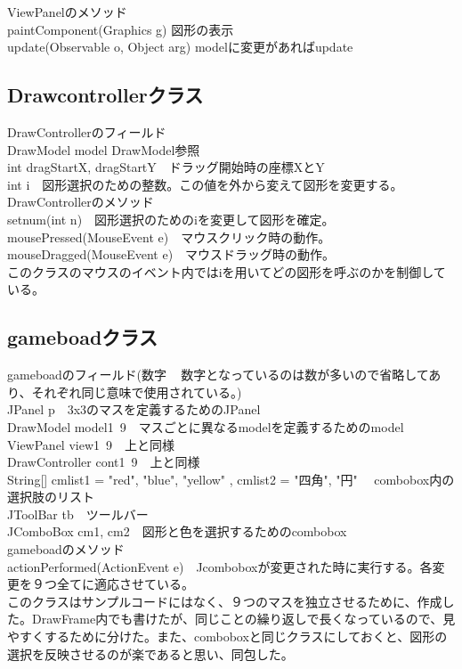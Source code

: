 \documentclass[12pt, a4paper, titlepage]{jsarticle}
\begin{document}
ViewPanelのメソッド\\
paintComponent(Graphics g) 図形の表示\\
update(Observable o, Object arg) modelに変更があればupdate

\subsection{Drawcontrollerクラス}
DrawControllerのフィールド\\
DrawModel model DrawModel参照\\
int dragStartX, dragStartY　ドラッグ開始時の座標XとY\\
int i　図形選択のための整数。この値を外から変えて図形を変更する。\\

DrawControllerのメソッド\\
setnum(int n)　図形選択のためのiを変更して図形を確定。\\
mousePressed(MouseEvent e)　マウスクリック時の動作。\\
mouseDragged(MouseEvent e)　マウスドラッグ時の動作。\\

このクラスのマウスのイベント内ではiを用いてどの図形を呼ぶのかを制御している。
\subsection{gameboadクラス}
gameboadのフィールド(数字 ~ 数字となっているのは数が多いので省略してあり、それぞれ同じ意味で使用されている。)\\
JPanel p　3x3のマスを定義するためのJPanel\\
DrawModel model1~9　マスごとに異なるmodelを定義するためのmodel\\
ViewPanel view1~9　上と同様\\
DrawController cont1~9　上と同様\\
String[] cmlist1 = { "red", "blue", "yellow" }, cmlist2 = { "四角", "円" }　combobox内の選択肢のリスト\\
JToolBar tb　ツールバー\\
JComboBox cm1, cm2　図形と色を選択するためのcombobox\\

gameboadのメソッド\\
actionPerformed(ActionEvent e)　Jcomboboxが変更された時に実行する。各変更を９つ全てに適応させている。\\

このクラスはサンプルコードにはなく、９つのマスを独立させるために、作成した。DrawFrame内でも書けたが、同じことの繰り返しで長くなっているので、見やすくするために分けた。また、comboboxと同じクラスにしておくと、図形の選択を反映させるのが楽であると思い、同包した。
\end{document}
